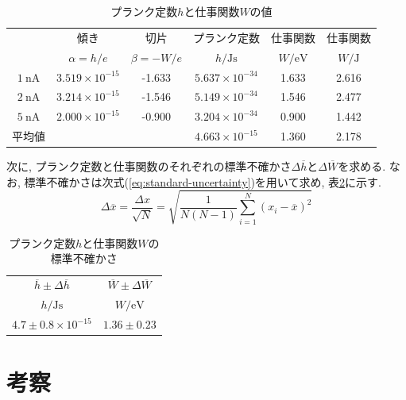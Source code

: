 \documentclass{jarticle}
\begin{document}
\begin{table}[H]
  \centering
  \caption{プランク定数$h$と仕事関数$W$の値}
  \label{tb:a-b-h-w}
  \begin{tabular}{cccccc}
    \hline
    & 傾き & 切片 & プランク定数 & 仕事関数 & 仕事関数 \\
    & $\alpha = h / e$ & $\beta = -W / e$ & $h/\mathrm{Js}$ & $W/\mathrm{eV}$ & $W/\mathrm{J}$\\
    \hline
    $1\ \mathrm{nA}$ & $3.519\times10^{-15}$ & -1.633 & $5.637\times10^{-34}$ & 1.633 & 2.616 \\
    $2\ \mathrm{nA}$ & $3.214\times10^{-15}$ & -1.546 & $5.149\times10^{-34}$ & 1.546 & 2.477 \\
    $5\ \mathrm{nA}$ & $2.000\times10^{-15}$ & -0.900 & $3.204\times10^{-34}$ & 0.900 & 1.442 \\
    \hline
    平均値 & & & $4.663\times10^{-15}$ & 1.360 & 2.178 \\
    \hline
  \end{tabular}
\end{table}

次に, プランク定数と仕事関数のそれぞれの標準不確かさ$\Delta\overline{h}$と$\Delta\overline{W}$を求める.
なお, 標準不確かさは次式(\ref{eq:standard-uncertainty})を用いて求め, 表\ref{tb:standard-uncertainty}に示す.
\begin{equation}
  \Delta\overline{x} = \frac{\Delta x}{\sqrt{N}} = \sqrt{\frac{1}{N(N-1)}\sum_{i=1}^N(x_i - \overline{x})^2}
  \label{eq:standard-uncertainty}
\end{equation}

\begin{table}[H]
  \centering
  \caption{プランク定数$h$と仕事関数$W$の標準不確かさ}
  \label{tb:standard-uncertainty}
  \begin{tabular}{cc}
    \hline
    $\overline{h}\pm\Delta\overline{h}$ & $\overline{W}\pm\Delta\overline{W}$ \\
    $h/\mathrm{Js}$ & $W/\mathrm{eV}$ \\
    \hline
    $4.7\pm0.8\times10^{-15}$ & $1.36\pm0.23$ \\
    \hline
  \end{tabular}
\end{table}



\section{考察}
\end{document}
